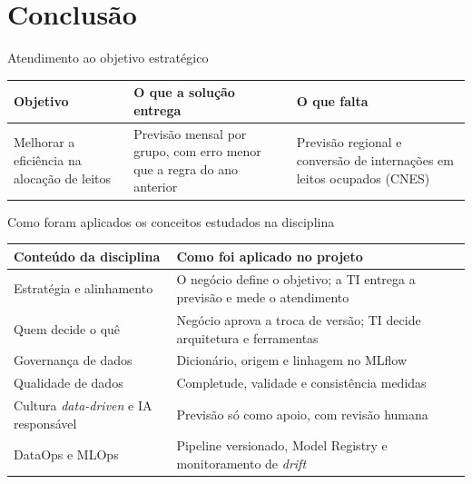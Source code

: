 \documentclass[aspectratio=169,10pt]{beamer}
\begin{document}
\section{Conclusão}

\begin{frame}{Atendimento ao objetivo estratégico}
  \centering
  \footnotesize
  \begin{tabular}{@{}>{\raggedright\arraybackslash}p{3.2cm}p{4.6cm}p{5.4cm}@{}}
    \toprule
    \textbf{Objetivo} & \textbf{O que a solução entrega} & \textbf{O que falta} \\
    \midrule
    Melhorar a eficiência na alocação de leitos & Previsão mensal por grupo, com erro menor que a regra do ano anterior & Previsão regional e conversão de internações em leitos ocupados (CNES) \\
    \bottomrule
  \end{tabular}

\end{frame}

\begin{frame}{Como foram aplicados os conceitos estudados na disciplina}
  \small
  \renewcommand{\arraystretch}{1.6}
  \begin{tabular}{@{}>{\raggedright\arraybackslash}p{}>{\raggedright\arraybackslash}p{}@{}}
    \toprule
    \textbf{Conteúdo da disciplina} & \textbf{Como foi aplicado no projeto} \\
    \midrule
    Estratégia e alinhamento & O negócio define o objetivo; a TI entrega a previsão e mede o atendimento \\
    Quem decide o quê & Negócio aprova a troca de versão; TI decide arquitetura e ferramentas \\
    Governança de dados & Dicionário, origem e linhagem no MLflow \\
    Qualidade de dados & Completude, validade e consistência medidas \\
    Cultura \textit{data-driven} e IA responsável & Previsão só como apoio, com revisão humana \\
    DataOps e MLOps & Pipeline versionado, Model Registry e monitoramento de \textit{drift} \\
    \bottomrule
  \end{tabular}
\end{frame}
\end{document}
